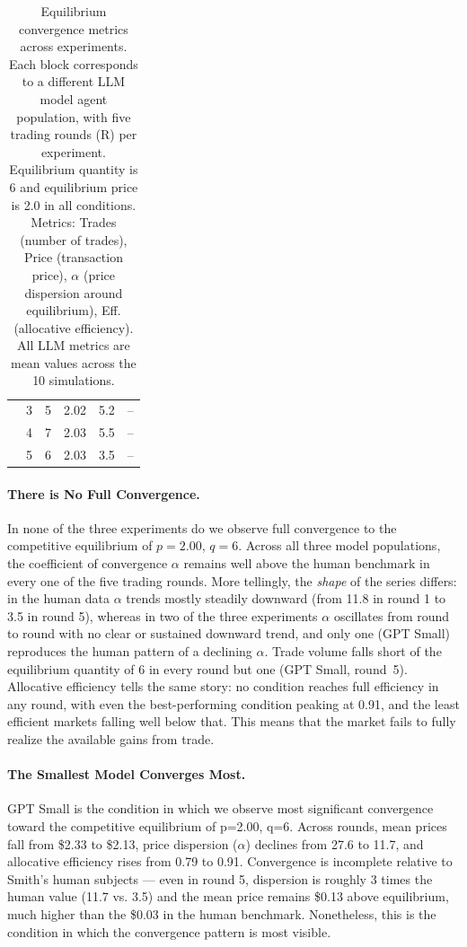 \documentclass[letterpaper]{article} %
\begin{document}
\begin{table}[t]
\begin{tabular}{@{}p{1.3cm}ccccc@{}}
                              & 3 & 5 & 2.02 & 5.2  & -- \\
                              & 4 & 7 & 2.03 & 5.5  & -- \\
                              & 5 & 6 & 2.03 & 3.5  & -- \\
\bottomrule
\end{tabular}
\caption{Equilibrium convergence metrics across experiments. Each block corresponds to a different LLM model agent population, with five trading rounds (R) per experiment. Equilibrium quantity is 6 and equilibrium price is 2.0 in all conditions. Metrics: Trades (number of trades), Price (transaction price), $\alpha$ (price dispersion around equilibrium), Eff. (allocative efficiency). All LLM metrics are mean values across the 10 simulations.}
\label{tab:smith-convergence}
\end{table}

\paragraph{There is No Full Convergence.}
In none of the three experiments do we observe full convergence to the
competitive equilibrium of $p=2.00$, $q=6$. Across all three model
populations, the coefficient of convergence $\alpha$ remains well above the
human benchmark in every one of the five trading rounds. More tellingly, the
\emph{shape} of the series differs: in the human data $\alpha$ trends mostly steadily
downward (from 11.8 in round 1 to 3.5 in round 5), whereas in two of the three
experiments $\alpha$ oscillates from round to round with no clear or sustained
downward trend, and only one (GPT Small) reproduces the human pattern of a declining
$\alpha$. Trade volume falls short of the equilibrium quantity of 6 in every round but one (GPT Small, round~5). Allocative efficiency tells the same story: no condition reaches full
efficiency in any round, with even the best-performing condition peaking at
0.91, and the least efficient markets falling well below that. This means that the market fails to fully realize the available gains from trade.


\paragraph{The Smallest Model Converges Most.}
GPT Small is the condition in which we observe most significant convergence toward the competitive equilibrium of p=2.00, q=6. Across rounds, mean prices fall from \$2.33 to \$2.13, price dispersion ($\alpha$) declines from 27.6 to 11.7, and allocative efficiency rises from 0.79 to 0.91. Convergence is incomplete relative to Smith's human subjects — even in round 5, dispersion is roughly 3 times the human value (11.7 vs. 3.5) and the mean price remains \$0.13 above equilibrium, much higher than the \$0.03 in the human benchmark. Nonetheless, this is the condition in which the convergence pattern is most visible.
\end{document}
